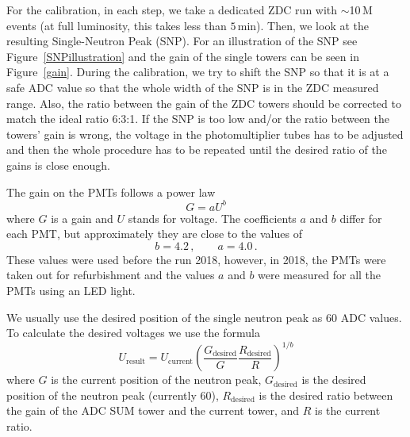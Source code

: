 % 



For the calibration, in each step, we take a dedicated ZDC run with
$\sim$10$\,$M events (at full luminosity, this takes less than $5\,$min). Then, we
look at the resulting Single-Neutron Peak (SNP).
For an illustration of the SNP see Figure~\ref{SNPillustration} and the gain of the single
towers can be seen in Figure~\ref{gain}.
During the calibration, we try to shift the SNP so that it is at a safe ADC value so that the whole width of the SNP is in the ZDC measured
range. Also, the ratio between the gain of the ZDC towers should be corrected to match the ideal ratio 6:3:1\@. If the
SNP is too low and/or the ratio between the towers' gain is wrong,
the voltage in the photomultiplier tubes has to be adjusted and then the whole procedure
has to be repeated until the desired ratio of the gains is close enough.

The gain on the PMTs follows a power law
\begin{equation}
G = aU^b
\end{equation}
where $G$ is a gain and $U$ stands for voltage. The coefficients $a$ and $b$ differ for each PMT, but approximately they are close to the values of~\cite{ZDCvoltsDependence}
\begin{equation}
b=4.2\,, \qquad a=4.0\,.
\end{equation}
These values were used before the run 2018, however, in 2018, the PMTs were taken out for refurbishment and the values $a$ and $b$ were measured for all the PMTs using an LED light.

We usually use the desired position of the single neutron peak as 60 ADC values. To calculate
the desired voltages we use the formula
\begin{equation}
U_{\text{result}} = U_\text{current}\left(\frac{G_\text{desired}}{G} 
\frac{R_\text{desired}}{R}\right)^{1/b}
\end{equation}
where $G$ is the current position of the neutron peak, $G_\text{desired}$ is the desired position
of the neutron peak (currently 60), $R_\text{desired}$ is the desired ratio between the gain of the ADC SUM
tower and the current tower, and $R$ is the current ratio.


